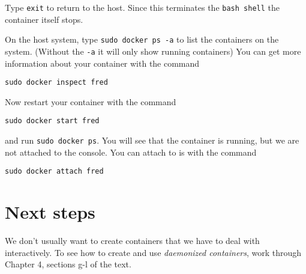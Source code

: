 \documentclass{article}
\begin{document}
Type \texttt{exit} to return to the host. Since this terminates the \texttt{bash shell} the container itself stops.

On the host system, type \texttt{sudo docker ps -a} to list the containers on the system. (Without the \texttt{-a} it will only show running containers) You can get more information about your container with the command

\texttt{sudo docker inspect fred}

Now restart your container with the command 

\texttt{sudo docker start fred}

and run \texttt{sudo docker ps}.  You will see that the container is running, but we are not attached to the console.  You can attach to is with the command

\texttt{sudo docker attach fred}

\section{Next steps}
We don't usually want to create containers that we have to deal with interactively.  To see how to create and use \emph{daemonized containers}, work through  Chapter 4, sections g-l of the text.
\end{document}
